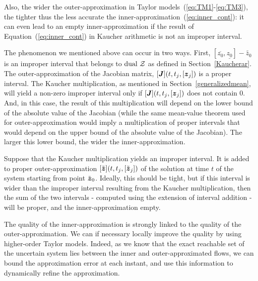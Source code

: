 \documentclass{sig-alternate-05-2015}
\newcommand{\dual}{\mbox{dual }}
\begin{document}
Also, the wider the outer-approximation in Taylor models~(\ref{eq:TM1}-\ref{eq:TM3}), the tighter thus the less accurate the inner-approximation~(\ref{eq:inner_cont}): 
it can even  lead to an empty inner-approximation if the result of Equation~(\ref{eq:inner_cont}) in Kaucher arithmetic is not an improper interval. 

The phenomenon we mentioned above can occur in two ways. First, $[\overline{z_0},\underline{z_0}]-\tilde{z_0}$ is an improper interval that belongs to $\dual {\cal Z}$ as defined 
in Section~\ref{Kaucherar}. The outer-approximation of the Jacobian matrix,  $[\J](t,t_j,[{\z}_j])$ is a proper interval. The Kaucher multiplication, as mentioned 
in Section~\ref{generalizedmean},
will yield a non-zero improper interval only if $[\J](t,t_j,[{\z}_j])$ does not contain $0$. And, in this case, the result of this multiplication will depend on the 
lower bound of the absolute value of the Jacobian (while the same mean-value theorem used for outer-approximation would imply a multiplication of proper intervals that would depend on the upper bound of the absolute value of the Jacobian). The larger this lower bound, the wider the inner-approximation. 

Suppose that the Kaucher multiplication  yields an improper interval. It is added to proper outer-approximation  $[\tilde{\z}](t,t_j,[\tilde{\z}_j])$ 
of the solution at time $t$ of the system starting from point $\tilde{\z}_0$. Ideally, this should be tight, but if this interval is wider than the improper 
interval resulting from the Kaucher multiplication, then the sum of the two intervals - computed using the extension of interval addition - will be proper, 
and the inner-approximation empty.


The quality of the inner-approxima\-tion is strongly linked to the quality of the outer-approxima\-tion. 
We can if necessary  locally improve the quality by using higher-order Taylor models. 
Indeed, as we know that the exact reachable set of the uncertain system lies between the inner and outer-approximated flows, 
we can bound the approximation error at each instant, and use this information to dynamically refine the approximation.  
\end{document}
